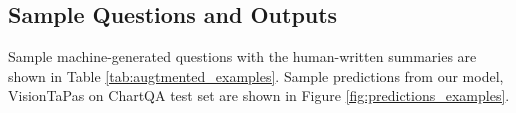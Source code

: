 \begin{table}[h!]
\centering
{}
\caption{
    Results for VisionTaPas and VL-T5 on the ChartQA test set by chart type.%
}
\label{tab:chartype}
\end{table}

\begin{table}[h!]
\centering
{}
\caption{
    Accuracies of VisionTaPas and VL-T5 on the ChartQA-H test set by question type on 200 random samples.
}
\label{tab:questiontype}
\end{table}







\subsection{Sample Questions and Outputs}
\label{app:examples}


Sample machine-generated questions with the human-written summaries are shown in Table \ref{tab:augtmented_examples}.
Sample predictions from our model, VisionTaPas on ChartQA test set are shown in Figure \ref{fig:predictions_examples}. 


